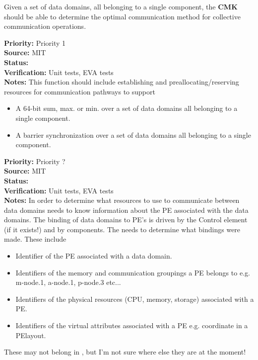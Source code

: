 Given a set of data domains, all belonging to a single component, the {\bf CMK} should be able to determine the
optimal communication method for collective communication
operations.
\begin{reqlist}
{\bf Priority:} Priority 1 \\
{\bf Source:}  MIT \\
{\bf Status:}  \\
{\bf Verification:} Unit tests, EVA tests \\
{\bf Notes:}
This function should include establishing and preallocating/reserving 
resources for communication pathways to support
\begin{itemize}
\item A 64-bit sum, max. or min. over a set of data domains all belonging to a single component.
\item A barrier synchronization over a set of data domains all belonging to a single component.
\end{itemize}
\end{reqlist}

\begin{reqlist}
{\bf Priority:} Priority ? \\
{\bf Source:}  MIT \\
{\bf Status:}  \\
{\bf Verification:} Unit tests, EVA tests \\
{\bf Notes:}
In order to determine what resources to use to communicate between data domains 
{\bf \shortname} needs to know information about the PE associated with the
data domains. The binding of data domains to PE's is driven by the Control element
(if it exists!) and by components. The {\bf \shortname} needs to determine what
bindings were made.
These include
\begin{itemize}
\item Identifier of the PE associated with a data domain.
\item Identifiers of the memory and communication groupings a PE
belongs to e.g. m-node.1, a-node.1, p-node.3 etc...
\item Identifiers of the physical resources (CPU, memory, storage) associated with a PE.
\item Identifiers of the virtual attributes associated with a PE e.g. coordinate in a PElayout.
\end{itemize}
These may not belong in {\bf \shortname}, but I'm not sure where else they
are at the moment!
\end{reqlist}

